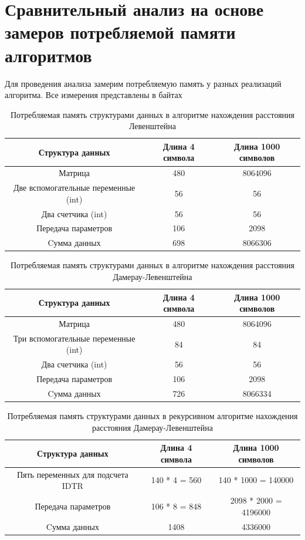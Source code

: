\documentclass[12pt]{report}
\begin{document}
\section{Сравнительный анализ на основе замеров потребляемой памяти алгоритмов}
\par Для проведения анализа замерим потребляемую память у разных реализаций алгоритма. Все измерения представлены в байтах

\begin{table} [h!]
\centering
\caption{Потребляемая память структурами данных в алгоритме нахождения расстояния Левенштейна}
	\begin{tabular}{|c c c|} 
 	\hline
	Структура данных & Длина 4 символа & Длина 1000 символов\\ [0.8ex] 
 	\hline\hline
 	Матрица & 480 & 8064096\\
 	\hline
 	Две вспомогательные переменные (int) & 56 & 56\\
 	\hline
	Два счетчика (int) & 56 & 56\\
	\hline
	Передача параметров & 106 & 2098\\
	\hline
	Cумма данных & 698 & 8066306\\
	\hline
	\end{tabular}
\end{table}

\begin{table} [h!]
\centering
\caption{Потребляемая память структурами данных в алгоритме нахождения расстояния Дамерау-Левенштейна}
	\begin{tabular}{|c c c|} 
 	\hline
	Структура данных & Длина 4 символа & Длина 1000 символов\\ [0.8ex] 
 	\hline\hline
 	Матрица & 480 & 8064096\\
 	\hline
 	Три вспомогательные переменные (int) & 84 & 84\\
 	\hline
	Два счетчика (int) & 56 & 56\\
	\hline
	Передача параметров & 106 & 2098\\
	\hline
	Cумма данных & 726 & 8066334\\
	\hline
	\end{tabular}
\end{table}

\begin{table} [h!]
\centering
\caption{Потребляемая память структурами данных в рекурсивном алгоритме нахождения расстояния Дамерау-Левенштейна}
	\begin{tabular}{|c c c|} 
 	\hline
	Структура данных & Длина 4 символа & Длина 1000 символов\\ [0.8ex] 
 	\hline\hline
 	Пять переменных для подсчета IDTR & 140 * 4 = 560 & 140 * 1000 = 140000\\
 	\hline
	Передача параметров & 106 * 8 = 848 & 2098 * 2000 = 4196000\\
	\hline
	Cумма данных & 1408 & 4336000\\
	\hline
	\end{tabular}
\end{table}
\end{document}
